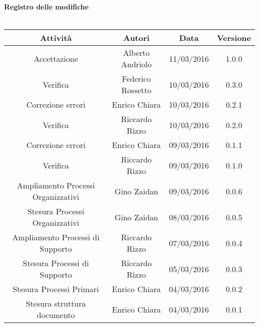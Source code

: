 \vspace{1cm}
   {\fontsize{15pt}{16pt}\selectfont \textbf{Registro delle modifiche}}\\ \\

\bgroup
\def\arraystretch{1.6}
\begin{tabular}{| c | c | c | c |}
\hline
\textbf{Attività} & \textbf{Autori} & \textbf{Data} & \textbf{Versione}\\ \hline \hline


Accettazione & Alberto Andriolo & 11/03/2016 & 1.0.0 \\ \hline  

Verifica & Federico Rossetto & 10/03/2016 & 0.3.0 \\ \hline

Correzione errori  & Enrico Chiara & 10/03/2016 & 0.2.1 \\ \hline

Verifica & Riccardo Rizzo & 10/03/2016 & 0.2.0 \\ \hline

Correzione errori  & Enrico Chiara & 09/03/2016 & 0.1.1 \\ \hline

Verifica & Riccardo Rizzo & 09/03/2016 & 0.1.0 \\ \hline  

Ampliamento Processi Organizzativi & Gino Zaidan & 09/03/2016 & 0.0.6 \\ \hline

Stesura Processi Organizzativi & Gino Zaidan & 08/03/2016 & 0.0.5 \\ \hline

Ampliamento Processi di Supporto & Riccardo Rizzo & 07/03/2016 & 0.0.4 \\ \hline

Stesura Processi di Supporto & Riccardo Rizzo & 05/03/2016 & 0.0.3 \\ \hline

Stesura Processi Primari & Enrico Chiara & 04/03/2016 & 0.0.2 \\ \hline 

Stesura struttura documento & Enrico Chiara & 04/03/2016 & 0.0.1 \\ \hline


\end{tabular}
\egroup
\newpage